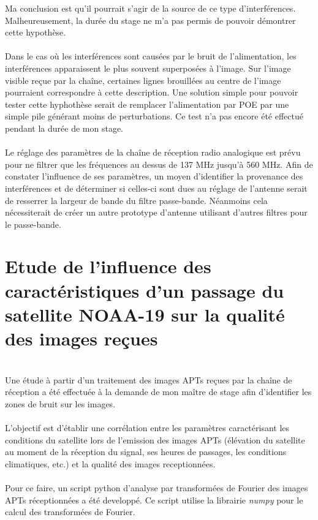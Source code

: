 \documentclass[12pt,fleqn]{book} %
\begin{document}
Ma conclusion est qu'il pourrait s'agir de la source de ce type d'interférences. Malheureusement, la durée du stage ne m'a pas permis de pouvoir démontrer cette hypothèse.
~\\\\Dans le cas où les interférences sont causées par le bruit de l'alimentation, les interférences apparaissent le plus souvent superposées à l'image. Sur l'image visible reçue par la chaîne, certaines lignes brouillées au centre de l'image pourraient correspondre à cette description. Une solution simple pour pouvoir tester cette hyphothèse serait de remplacer l'alimentation par POE par une simple pile générant moins de perturbations.
Ce test n'a pas encore été effectué pendant la durée de mon stage.
~\\\\Le réglage des paramètres de la chaîne de réception radio analogique est prévu pour ne filtrer que les fréquences au dessus de 137 MHz jusqu'à 560 MHz. Afin de constater l'influence de ses paramètres, un moyen d'identifier la provenance des interférences et de déterminer si celles-ci sont dues au réglage de l'antenne serait de resserrer la largeur de bande du filtre passe-bande. Néanmoins cela nécessiterait de créer un autre prototype d'antenne utilisant d'autres filtres pour le passe-bande.
\section{Etude de l'influence des caractéristiques d'un passage du satellite NOAA-19 sur la qualité des images reçues}
~\\\indent Une étude à partir d'un traitement des images APTs reçues par la chaîne de réception a été effectuée à la demande de mon maître de stage afin d'identifier les zones de bruit sur les images.
~\\\\L'objectif est d'établir une corrélation entre les paramètres caractérisant les conditions du satellite lors de l'emission des images APTs (élévation du satellite au moment de la réception du signal, ses heures de passages, les conditions climatiques, etc.) et la qualité des images receptionnées.
~\\\\Pour ce faire, un script python d'analyse par transformées de Fourier des images APTs réceptionnées a été developpé. Ce script utilise la librairie \emph{numpy} pour le calcul des transformées de Fourier. 
\end{document}
